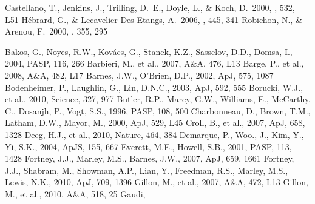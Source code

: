 \documentclass[12pt,preprint]{emulateapj}
\begin{document}
\begin{thebibliography}{}
 Castellano, T., 
Jenkins, J., Trilling, D.~E., Doyle, L., \& Koch, D.\ 2000, \apjl, 532, L51 
 H{\'e}brard, G., \& Lecavelier Des Etangs, A.\ 2006, \aap, 445, 341 
 Robichon, N., \& Arenou, F.\ 2000, \aap, 355, 295 



 Bakos,
  G., Noyes, R.W., Kov\'acs, G., Stanek, K.Z., Sasselov, D.D., Domsa,
  I., 2004, PASP, 116, 266
  Barbieri, M., et al., 2007, A\&A, 476, L13
  Barge, P., et al., 2008, A\&A, 482, L17
  Barnes, J.W., O'Brien, D.P., 2002, ApJ, 575, 1087
  Bodenheimer, P., Laughlin, G., Lin, D.N.C., 2003, ApJ, 592, 555
  Borucki, W.J., et al., 2010, Science, 327, 977
 Butler,
  R.P., Marcy, G.W., Williams, E., McCarthy, C., Dosanjh, P., Vogt,
  S.S., 1996, PASP, 108, 500
  Charbonneau, D., Brown, T.M., Latham, D.W., Mayor, M., 2000, ApJ,
  529, L45
 Croll,
  B., et al., 2007, ApJ, 658, 1328
  Deeg, H.J., et al., 2010, Nature, 464, 384
  Demarque, P., Woo., J., Kim, Y., Yi, S.K., 2004, ApJS, 155, 667
  Everett, M.E., Howell, S.B., 2001, PASP, 113, 1428
  Fortney, J.J., Marley, M.S., Barnes, J.W., 2007, ApJ, 659, 1661
  Fortney, J.J., Shabram, M., Showman, A.P., Lian, Y., Freedman,
  R.S., Marley, M.S., Lewis, N.K., 2010, ApJ, 709, 1396
 Gillon,
  M., et al., 2007, A\&A, 472, L13
 Gillon,
  M., et al., 2010, A\&A, 518, 25
 Gaudi,

\end{thebibliography}
\end{document}
